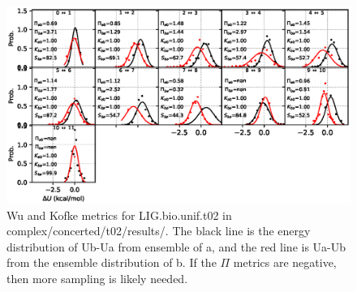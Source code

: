 \documentclass[journal=jctcce,manuscript=article,hyperref=false]{achemso}
\begin{document}
\begin{figure}
\includegraphics[clip,width=6in]{complex.concerted.t02.results..hist.eps}\vspace{-0.3cm}
                        \caption{Wu and Kofke metrics for LIG.bio.unif.t02 in complex/concerted/t02/results/. The black line is the energy distribution of Ub-Ua from ensemble of a, and the red line is Ua-Ub from the ensemble distribution of b. If the $\Pi$ metrics are negative, then more sampling is likely needed.}
\end{figure}
\end{document}
